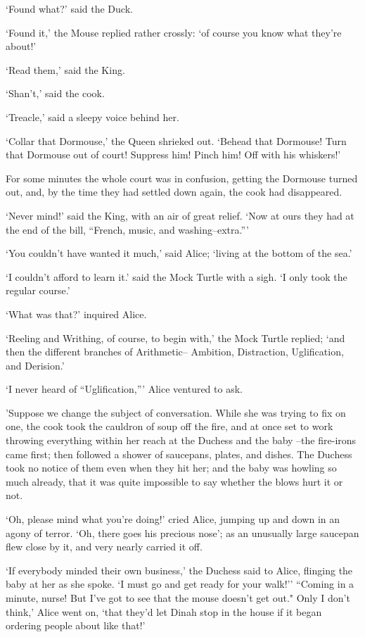 \documentclass[statementpaper,twoside,openany]{memoir}
\begin{document}
`Found what?' said the Duck.

`Found it,' the Mouse replied rather crossly: `of course you know what they're about!'

`Read them,' said the King.

`Shan't,' said the cook.

`Treacle,' said a sleepy voice behind her.

`Collar that Dormouse,' the Queen shrieked out. `Behead that Dormouse! Turn that Dormouse out of court! Suppress him! Pinch him! Off with his whiskers!'

For some minutes the whole court was in confusion, getting the Dormouse turned out, and, by the time they had settled down again, the cook had disappeared.

`Never mind!' said the King, with an air of great relief. `Now at ours they had at the end of the bill, ``French, music, and washing--extra.'''

`You couldn't have wanted it much,' said Alice; `living at the bottom of the sea.'

`I couldn't afford to learn it.' said the Mock Turtle with a sigh. `I only took the regular course.'

`What was that?' inquired Alice.

`Reeling and Writhing, of course, to begin with,' the Mock Turtle replied; `and then the different branches of Arithmetic-- Ambition, Distraction, Uglification, and Derision.'

`I never heard of ``Uglification,''' Alice ventured to ask.

'Suppose we change the subject of conversation. While she was trying to fix on one, the cook took the cauldron of soup off the fire, and at once set to work throwing everything within her reach at the Duchess and the baby --the fire-irons came first; then followed a shower of saucepans, plates, and dishes. The Duchess took no notice of them even when they hit her; and the baby was howling so much already, that it was quite impossible to say whether the blows hurt it or not.

`Oh, please mind what you're doing!' cried Alice, jumping up and down in an agony of terror. `Oh, there goes his precious nose'; as an unusually large saucepan flew close by it, and very nearly carried it off.

`If everybody minded their own business,' the Duchess said to Alice, flinging the baby at her as she spoke. `I must go and get ready for your walk!'' ``Coming in a minute, nurse! But I've got to see that the mouse doesn't get out." Only I don't think,' Alice went on, `that they'd let Dinah stop in the house if it began ordering people about like that!'
\end{document}
